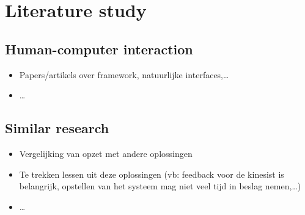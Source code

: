 \chapter{Literature study}

\section{Human-computer interaction}

\begin{itemize}
\item Papers/artikels over framework, natuurlijke interfaces,\ldots
\item \ldots
\end{itemize}


\section{Similar research}

\begin{itemize}
\item Vergelijking van opzet met andere oplossingen
\item Te trekken lessen uit deze oplossingen (vb: feedback voor de kinesist is belangrijk, opstellen van het systeem mag niet veel tijd in beslag nemen,\ldots)
\item \ldots
\end{itemize}